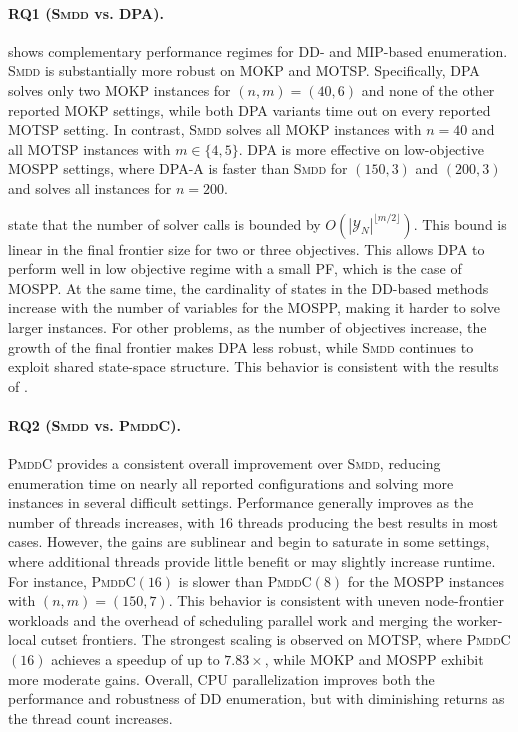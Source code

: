 \documentclass[letterpaper]{article}
\begin{document}
\label{sec:results}
\paragraph{RQ1 (\textsc{Smdd} vs. DPA).}
 shows complementary performance regimes for DD- and MIP-based enumeration. \textsc{Smdd} is substantially more robust on MOKP and MOTSP. Specifically, DPA solves only two MOKP instances for $(n,m)=(40,6)$ and none of the other reported MOKP settings, while both DPA variants time out on every reported MOTSP setting. In contrast, \textsc{Smdd} solves all MOKP instances with $n=40$ and all MOTSP instances with $m\in \{4,5\}$. DPA is more effective on low-objective MOSPP settings, where DPA-A is faster than \textsc{Smdd} for $(150,3)$ and $(200,3)$ and solves all instances for $n=200$. 

\citet{dachert2024simple} state that the number of solver calls is bounded by \(O(|\mathcal{Y}_N|^{\lfloor m/2\rfloor})\). This bound is linear in the final frontier size for two or three objectives. This allows DPA to perform well in low objective regime with a small PF, which is the case of MOSPP. 
At the same time, the cardinality of states in the DD-based methods increase with the number of variables for the MOSPP, making it harder to solve larger instances.
For other problems, as the number of objectives increase, the growth of the final frontier makes DPA less robust, while \textsc{Smdd} continues to exploit shared state-space structure. This behavior is consistent with the results of \citet{bergman2022network}.

\paragraph{RQ2 (\textsc{Smdd} vs. \textsc{PmddC}).}
\textsc{PmddC} provides a consistent overall improvement over \textsc{Smdd}, reducing enumeration time on nearly all reported configurations and solving more instances in several difficult settings. Performance generally improves as the number of threads increases, with 16 threads producing the best results in most cases. However, the gains are sublinear and begin to saturate in some settings, where additional threads provide little benefit or may slightly increase runtime. For instance, \textsc{PmddC}$(16)$ is slower than \textsc{PmddC}$(8)$ for the MOSPP instances with $(n, m) = (150, 7)$. This behavior is consistent with uneven node-frontier workloads and the overhead of scheduling parallel work and merging the worker-local cutset frontiers. The strongest scaling is observed on MOTSP, where \textsc{PmddC}$(16)$ achieves a speedup of up to $7.83\times$, while MOKP and MOSPP exhibit more moderate gains. Overall, CPU parallelization improves both the performance and robustness of DD enumeration, but with diminishing returns as the thread count increases.
\end{document}
